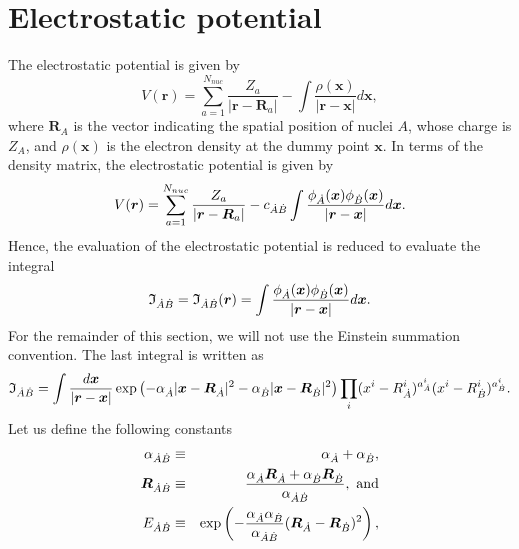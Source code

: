 \section{Electrostatic potential}

The electrostatic potential is given by
%
\begin{equation}
   V(\boldsymbol{r})=\sum_{a=1}^{N_{nuc}}\frac{Z_a}{|\boldsymbol{r}-\boldsymbol{R}_a|}-\int\frac{\rho(\boldsymbol{x})}{|\boldsymbol{r}-\boldsymbol{x}|}d\boldsymbol{x},
\end{equation}
%
where $\boldsymbol{R}_A$ is the vector indicating the spatial position of nuclei $A$, whose charge is $Z_A$, and $\rho(\boldsymbol{x})$ is the electron density at the dummy point $\boldsymbol{x}$. In terms of the density matrix, the electrostatic potential is given by
%
\begin{equation}
   V(\boldsymbol{r})=\sum_{a=1}^{N_{nuc}}\frac{Z_a}{|\boldsymbol{r}-\boldsymbol{R}_a|}-c_{\dot{A}\dot{B}}\int\frac{\phi_{\dot{A}}(\boldsymbol{x})\phi_{\dot{B}}(\boldsymbol{x})}{|\boldsymbol{r}-\boldsymbol{x}|}d\boldsymbol{x}.
\end{equation}
%
Hence, the evaluation of the electrostatic potential is reduced to evaluate the integral
%
\begin{equation}
   \mathfrak{I}_{\dot{A}\dot{B}}=\mathfrak{I}_{\dot{A}\dot{B}}(\boldsymbol{r})=\int\frac{\phi_{\dot{A}}(\boldsymbol{x})\phi_{\dot{B}}(\boldsymbol{x})}{|\boldsymbol{r}-\boldsymbol{x}|}d\boldsymbol{x}.
\end{equation}
%
For the remainder of this section, we will not use the Einstein summation convention. The last integral is written as
%
\begin{equation}
\mathfrak{I}_{\dot{A}\dot{B}}=\int\frac{d\boldsymbol{x}}{|\boldsymbol{r}-\boldsymbol{x}|}
                   \exp\left(-\alpha_{\dot{A}}|\boldsymbol{x}-\boldsymbol{R}_{\dot{A}}|^2
                             -\alpha_{\dot{B}}|\boldsymbol{x}-\boldsymbol{R}_{\dot{B}}|^2\right)
                   \prod_i(x^i-R_{\dot{A}}^i)^{a_{\dot{A}}^i}(x^i-R_{\dot{B}}^i)^{a_{\dot{B}}^i}.
\end{equation}
%
Let us define the following constants
%
\begin{eqnarray}
   \alpha_{\dot{A}\dot{B}}&\equiv&\alpha_{\dot{A}}+\alpha_{\dot{B}},\\
   \boldsymbol{R}_{\dot{A}\dot{B}}&\equiv&\frac{\alpha_{\dot{A}}\boldsymbol{R}_{\dot{A}}+\alpha_{\dot{B}}\boldsymbol{R}_{\dot{B}}}{\alpha_{\dot{A}\dot{B}}}, \textrm{\ and}\\
   E_{\dot{A}\dot{B}}&\equiv&\exp\left(-\frac{\alpha_{\dot{A}}\alpha_{\dot{B}}}{\alpha_{\dot{A}\dot{B}}}(\boldsymbol{R}_{\dot{A}}-\boldsymbol{R}_{\dot{B}})^2\right),
\end{eqnarray}
